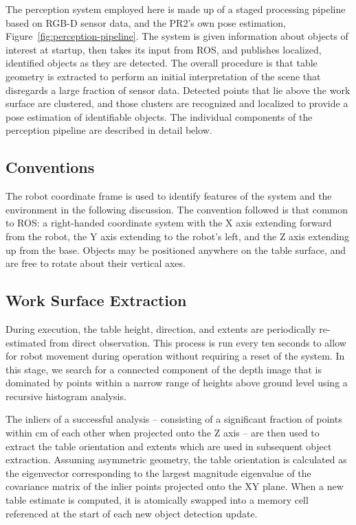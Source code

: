 \documentclass[letterpaper, 10 pt, conference]{ieeeconf}  %
\begin{document}
The perception system employed here is made up of a staged processing
pipeline based on RGB-D sensor data, and the PR2's own pose
estimation, Figure~\ref{fig:perception-pipeline}. The system is given
information about objects of interest at startup, then takes its input
from ROS, and publishes localized, identified objects as they are
detected. The overall procedure is that table geometry is extracted to
perform an initial interpretation of the scene that disregards a large
fraction of sensor data. Detected points that lie above the work
surface are clustered, and those clusters are recognized and localized
to provide a pose estimation of identifiable objects. The individual
components of the perception pipeline are described in detail below.

\subsection{Conventions}
The robot coordinate frame is used to identify features of the system
and the environment in the following discussion. The convention
followed is that common to ROS: a right-handed coordinate system with
the X axis extending forward from the robot, the Y axis extending to
the robot's left, and the Z axis extending up from the base. Objects
may be positioned anywhere on the table surface, and are free to
rotate about their vertical axes.

\subsection{Work Surface Extraction}
\label{sec:table-detection}
During execution, the table height, direction, and extents are
periodically re-estimated from direct observation. This process is run
every ten seconds to allow for robot movement during operation without
requiring a reset of the system. In this stage, we search for a
connected component of the depth image that is dominated by points
within a narrow range of heights above ground level using a recursive
histogram analysis.

The inliers of a successful analysis -- consisting of a significant
fraction of points within \unit[2]{cm} of each other when projected
onto the Z axis -- are then used to extract the table orientation and
extents which are used in subsequent object extraction. Assuming
asymmetric geometry, the table orientation is calculated as the
eigenvector corresponding to the largest magnitude eigenvalue of the
covariance matrix of the inlier points projected onto the XY
plane. When a new table estimate is computed, it is atomically swapped
into a memory cell referenced at the start of each new object
detection update.
\end{document}
